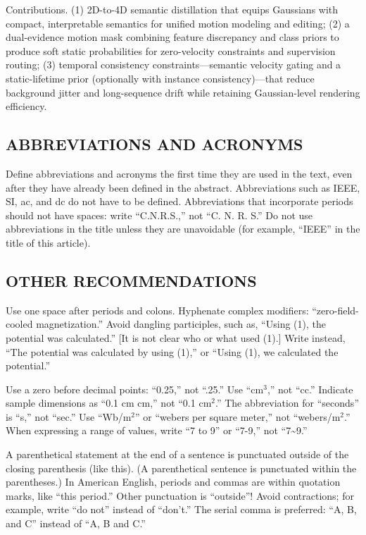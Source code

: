 \documentclass{IEEEoj}
\begin{document}
Contributions. (1) 2D-to-4D semantic distillation that equips Gaussians with compact, interpretable semantics for unified motion modeling and editing; (2) a dual-evidence motion mask combining feature discrepancy and class priors to produce soft static probabilities for zero-velocity constraints and supervision routing; (3) temporal consistency constraints—semantic velocity gating and a static-lifetime prior (optionally with instance consistency)—that reduce background jitter and long-sequence drift while retaining Gaussian-level rendering efficiency.

\subsection{ABBREVIATIONS AND ACRONYMS}
Define abbreviations and acronyms the first time they are used in the text, 
even after they have already been defined in the abstract. Abbreviations 
such as IEEE, SI, ac, and dc do not have to be defined. Abbreviations that 
incorporate periods should not have spaces: write ``C.N.R.S.,'' not ``C. N. 
R. S.'' Do not use abbreviations in the title unless they are unavoidable 
(for example, ``IEEE'' in the title of this article).

\subsection{OTHER RECOMMENDATIONS}
Use one space after periods and colons. Hyphenate complex modifiers: 
``zero-field-cooled magnetization.'' Avoid dangling participles, such as, 
``Using (1), the potential was calculated.'' [It is not clear who or what 
used (1).] Write instead, ``The potential was calculated by using (1),'' or 
``Using (1), we calculated the potential.''

Use a zero before decimal points: ``0.25,'' not ``.25.'' Use ``cm$^3$,'' not 
``cc.'' Indicate sample dimensions as ``0.1 cm  cm,'' not 
``0.1  cm$^{2}$.'' The abbreviation for ``seconds'' is ``s,'' 
not ``sec.'' Use ``Wb/m$^{2}$'' or ``webers per square meter,'' not 
``webers/m$^2$.'' When expressing a range of values, write ``7 to 9'' or 
``7-9,'' not ``7\textasciitilde 9.''

A parenthetical statement at the end of a sentence is punctuated outside of 
the closing parenthesis (like this). (A parenthetical sentence is punctuated 
within the parentheses.) In American English, periods and commas are within 
quotation marks, like ``this period.'' Other punctuation is ``outside''! 
Avoid contractions; for example, write ``do not'' instead of ``don't.'' The 
serial comma is preferred: ``A, B, and C'' instead of ``A, B and C.''
\end{document}
